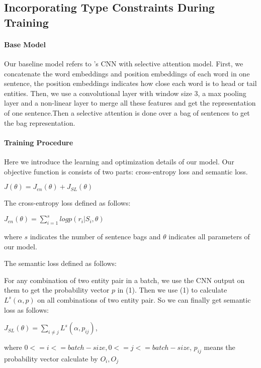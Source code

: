 \subsection{Incorporating  Type Constraints During Training}

\paragraph{Base Model}
Our baseline model refers to \cite{lin2016neural}'s CNN with selective attention model. First, we concatenate the word embeddings and position embeddings of each word in one sentence, the position embeddings indicates how close each word is to head or tail entities. Then, we use a convolutional layer with window size 3, a max pooling layer and a non-linear layer to merge all these features and get the representation of one sentence.Then a selective attention is done over a bag of sentences to get the bag representation.

\paragraph{Training Procedure}
Here we introduce the learning and optimization details of our model. Our objective function is consists of two parts: cross-entropy loss and semantic loss.
\begin{center}
	$ J(\theta) = J_{en}(\theta) + J_{SL}(\theta)$
\end{center}

The cross-entropy loss defined as follows:
\begin{center}
	$ J_{en}(\theta)= \sum\limits_{i=1}^{s}logp(r_i|S_i, \theta)$	
\end{center}
where $ s $ indicates the number of sentence bags and $ \theta $ indicates all parameters of our model.

The semantic loss defined as follows:

For any combination of two entity pair in a batch, we use the CNN output on them to get the probability vector $ p $ in (1). Then we use (1) to calculate $L^{s}(\alpha, p)$ on all combinations of two entity pair. So we can finally get semantic loss as follows:
\begin{center}
	$ J_{SL}(\theta) = \sum\limits_{i \neq j}L^{s}(\alpha, p_{ij}) $,
\end{center}
where $0<=i<=batch-size, 0<=j<=batch-size$, $ p_{ij} $ means the probability vector calculate by $ O_i, O_j $

